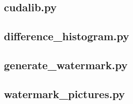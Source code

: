 \documentclass[a4paper,12pt]{article}
\begin{document}
\subsection*{cudalib.py}

\newpage
\subsection*{difference\_histogram.py}

\newpage
\subsection*{generate\_watermark.py}

\newpage
\subsection*{watermark\_pictures.py}

\end{document}
